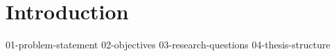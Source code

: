 \section{Introduction}

{01-problem-statement}
{02-objectives}
{03-research-questions}
{04-thesis-structure}
